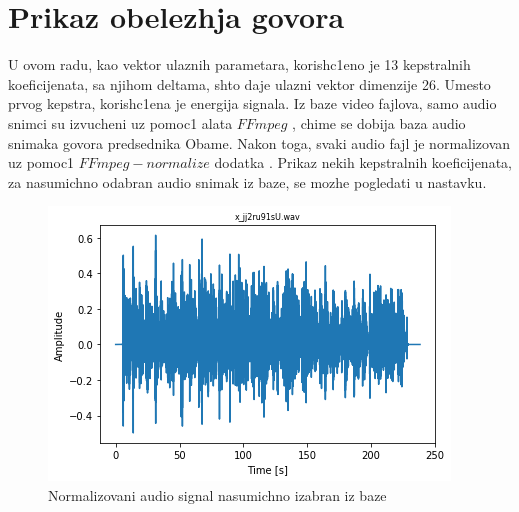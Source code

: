 \documentclass[a4paper, openany, oneside, 11pt]{book}
\begin{document}
\section{Prikaz obelezhja govora}
U ovom radu, kao vektor ulaznih parametara, korish\-c1eno je 13 kepstralnih koeficijenata, sa njihom deltama, shto daje ulazni vektor dimenzije 26. Umesto prvog kepstra, korish\-c1ena je energija signala. Iz baze video fajlova, samo audio snimci su izvucheni uz pomoc1 alata $FFmpeg$ \cite{FFmpeg}, chime se dobija baza audio snimaka govora predsednika Obame. Nakon toga, svaki audio fajl je normalizovan uz pomoc1 $FFmpeg-normalize$ dodatka \cite{FFmpegN}. Prikaz nekih kepstralnih koeficijenata, za nasumichno odabran audio snimak iz baze, se mozhe pogledati u nastavku.
\begin{figure}[h!]
\centering
  \includegraphics[scale=0.5]{res/audio_sig.png}
  \caption{Normalizovani audio signal nasumichno izabran iz baze}
  \label{fig:3}
  \vspace{0pt}
\end{figure}
\end{document}
